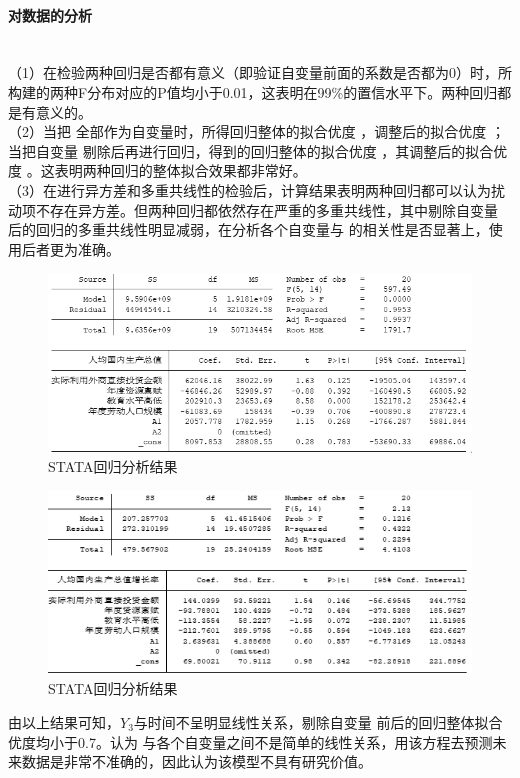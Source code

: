 \documentclass[UTF8]{article}
\begin{document}
	\paragraph{对数据的分析}
	~\\\indent（1）在检验两种回归是否都有意义（即验证自变量前面的系数是否都为0）时，所构建的两种F分布对应的P值均小于0.01，这表明在99\%的置信水平下。两种回归都是有意义的。
	\\\indent（2）当把 全部作为自变量时，所得回归整体的拟合优度 ，调整后的拟合优度 ；当把自变量 剔除后再进行回归，得到的回归整体的拟合优度 ，其调整后的拟合优度 。这表明两种回归的整体拟合效果都非常好。
	\\\indent（3）在进行异方差和多重共线性的检验后，计算结果表明两种回归都可以认为扰动项不存在异方差。但两种回归都依然存在严重的多重共线性，其中剔除自变量 后的回归的多重共线性明显减弱，在分析各个自变量与 的相关性是否显著上，使用后者更为准确。
	\\
	\begin{figure}[htb]
	\centering
	\includegraphics[width=12cm]{pictures/nhjg4.png}
	\caption{STATA回归分析结果}
	\label{nhjg4}
	\end{figure}
	\newpage
	\begin{figure}[htb]
		\centering
		\includegraphics[width=12cm]{pictures/nhjg6.png}
		\caption{STATA回归分析结果}
		\label{nhjg6}
	\end{figure}
	由以上结果可知，$Y_3$与时间不呈明显线性关系，剔除自变量 前后的回归整体拟合优度均小于0.7。认为 与各个自变量之间不是简单的线性关系，用该方程去预测未来数据是非常不准确的，因此认为该模型不具有研究价值。
\end{document}
